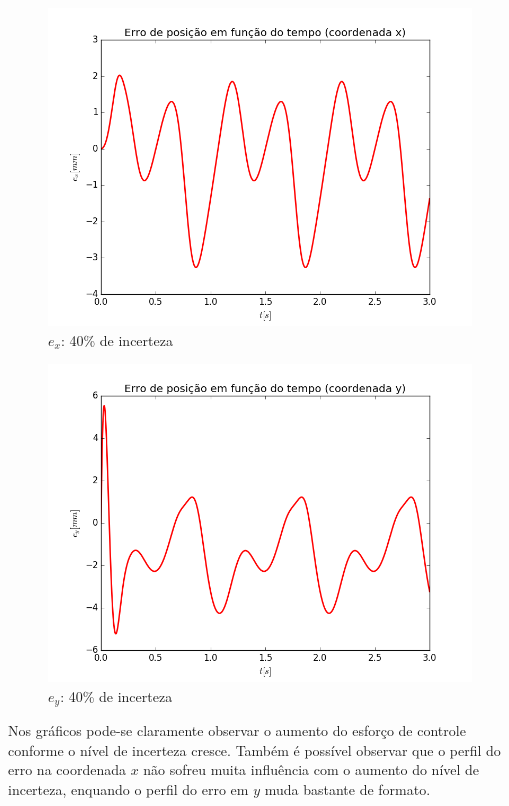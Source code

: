 \documentclass[]{politex}
\begin{document}
\begin{multicols}{2}
\begin{figure}[H]
	\centering
	\includegraphics[scale=0.42]{imagens/ex_40.png}  
	\caption{$e_x$: 40\% de incerteza}
	\label{fig:ex_40}
\end{figure}
\begin{figure}[H]
	\centering
	\includegraphics[scale=0.42]{imagens/ey_40.png}  
	\caption{$e_y$: 40\% de incerteza}
	\label{fig:ey_40}
\end{figure}
\end{multicols}

Nos gráficos pode-se claramente observar o aumento do esforço de controle conforme o nível de incerteza cresce. Também é possível observar que o perfil do erro na coordenada $x$ não sofreu muita influência com o aumento do nível de incerteza, enquando o perfil do erro em $y$ muda bastante de formato.
\end{document}
